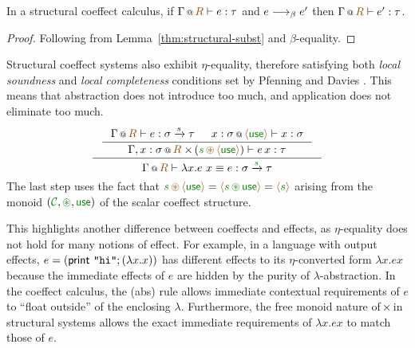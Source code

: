 \begin{theorem}
In a structural coeffect calculus, if $\coctx{\Gamma}{\aclrd{R}} \vdash e : \tau$ and
$e \longrightarrow_\beta e'$ then $\coctx{\Gamma}{\aclrd{R}} \vdash e' : \tau$.
\end{theorem}
\begin{proof}
Following from Lemma~\ref{thm:structural-subst} and $\beta$-equality.  
\end{proof}

\noindent
Structural coeffect systems also exhibit $\eta$-equality, therefore satisfying both
\emph{local soundness} and \emph{local completeness} conditions set by Pfenning and Davies
\cite{logic-modal-reconstruction}. This means that abstraction does not introduce too much, 
and application does not eliminate too much.
%
\begin{equation*}
\inference{
  \inference 
    {\coctx{\Gamma}{\aclrd{R}} \vdash e : \sigma \xrightarrow{s} \tau & 
     \coctx{x:\sigma}{\alift{\cunit}} \vdash x : \sigma}
    {\coctx{\Gamma, x:\sigma}{\aclrd{R} \,\cons\, (\cclrd{s} \,\aseq\, \alift{\cunit})} \vdash e \, x : \tau}}
  {\coctx{\Gamma}{\aclrd{R}} \vdash \lambda x.e~x  \equiv e 
: \sigma \xrightarrow{\cclrd{s}} \tau}
\end{equation*}
%
The last step uses the fact that 
$\cclrd{s} \,\aseq\, \alift{\cunit} = \alift{\cclrd{s} \,\cseq\, \cunit} = \alift{\cclrd{s}}$ 
arising from the monoid $(\C, \cseq, \cunit)$ of the scalar coeffect structure.

This highlights another difference between coeffects and effects, as $\eta$-equality does
not hold for many notions of effect. For example, in a language with output
effects, $e = (\textsf{print \texttt{"hi"}}; (\lambda x . x))$ has different effects to 
its $\eta$-converted form $\lambda x . e x$ because the immediate effects of $e$ are
hidden by the purity of $\lambda$-abstraction. In the coeffect calculus, the (abs) rule
allows immediate contextual requirements of $e$ to ``float outside'' of the enclosing
$\lambda$. Furthermore, the free monoid nature of $\hspace{-0.15em}\times\hspace{-0.25em}$ in structural systems allows 
the exact immediate requirements of $\lambda x . e x$ to match those of $e$. 


\newpage



%
%                                      

